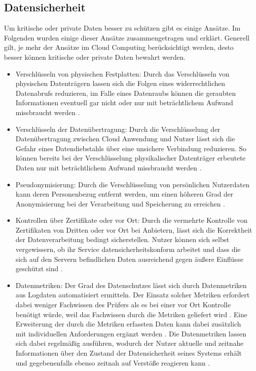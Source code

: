 \subsection{Datensicherheit} 
Um kritische oder private Daten besser zu schützen gibt es einige Ansätze. Im Folgenden wurden einige dieser Ansätze zusammengetragen und erklärt. Generell gilt, je mehr der Ansätze im Cloud Computing berücksichtigt werden, desto besser können kritische oder private Daten bewahrt werden.
\begin{itemize}
\item
Verschlüsseln von physischen Festplatten: Durch das Verschlüsseln von physischen Datenträgern lassen sich die Folgen eines widerrechtlichen Datenabrufs reduzieren, im Falle eines Datenraubs können die geraubten Informationen eventuell gar nicht oder nur mit beträchtlichem Aufwand missbraucht werden \cite{selzer2020}.
\item
Verschlüsseln der Datenübertragung: Durch die Verschlüsselung der Datenübertragung zwischen Cloud Anwendung und Nutzer lässt sich die Gefahr eines Datendiebstahls über eine unsichere Verbindung reduzieren. So können bereits bei der Verschlüsselung physikalischer Datenträger erbeutete Daten nur mit beträchtlichem Aufwand missbraucht werden \cite{selzer2020}.
\item
Pseudonymisierung: Durch die Verschlüsselung von persönlichen Nutzerdaten kann deren  Personenbezug entfernt werden, um einen höheren Grad der Anonymisierung bei der Verarbeitung und Speicherung zu erreichen \cite{selzer2020}.
\item
Kontrollen über Zertifikate oder vor Ort: Durch die vermehrte Kontrolle von Zertifikaten von Dritten oder vor Ort bei Anbietern, lässt sich die Korrektheit der Datenverarbeitung bedingt sicherstellen. Nutzer können sich selbst vergewissern, ob ihr Service datensicherheitskonform arbeitet und dass die sich auf den Servern befindlichen Daten ausreichend gegen äußere Einflüsse geschützt sind \cite{selzer2020}. 
\item 
Datenmetriken: Der Grad des Datenschutzes lässt sich durch Datenmetriken aus Logdaten automatisiert ermitteln. Der Einsatz solcher Metriken erfordert dabei weniger Fachwissen des Prüfers als es bei einer vor Ort Kontrolle benötigt würde, weil das Fachwissen durch die Metriken geliefert wird \cite{selzer2020}. Eine Erweiterung der durch die Metriken erfassten Daten kann dabei zusätzlich mit individuellen Anforderungen ergänzt werden \cite{selzer2020}. Die Datenmetriken lassen sich dabei regelmäßig ausführen, wodurch der Nutzer aktuelle und zeitnahe Informationen über den Zustand der Datensicherheit seines Systems erhält und gegebenenfalls ebenso zeitnah auf Verstöße reagieren kann \cite{selzer2020}.

\end{itemize}
